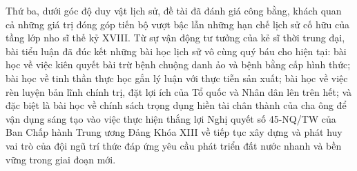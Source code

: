 Thứ ba, dưới góc độ duy vật lịch sử, đề tài đã đánh giá công bằng, khách quan cả những giá trị đóng góp tiến bộ vượt bậc lẫn những hạn chế lịch sử cố hữu của tầng lớp nho sĩ thế kỷ XVIII. Từ sự vận động tư tưởng của kẻ sĩ thời trung đại, bài tiểu luận đã đúc kết những bài học lịch sử vô cùng quý báu cho hiện tại: bài học về việc kiên quyết bài trừ bệnh chuộng danh ảo và bệnh bằng cấp hình thức; bài học về tinh thần thực học gắn lý luận với thực tiễn sản xuất; bài học về việc rèn luyện bản lĩnh chính trị, đặt lợi ích của Tổ quốc và Nhân dân lên trên hết; và đặc biệt là bài học về chính sách trọng dụng hiền tài chân thành của cha ông để vận dụng sáng tạo vào việc thực hiện thắng lợi Nghị quyết số 45-NQ/TW của Ban Chấp hành Trung ương Đảng Khóa XIII về tiếp tục xây dựng và phát huy vai trò của đội ngũ trí thức đáp ứng yêu cầu phát triển đất nước nhanh và bền vững trong giai đoạn mới.

